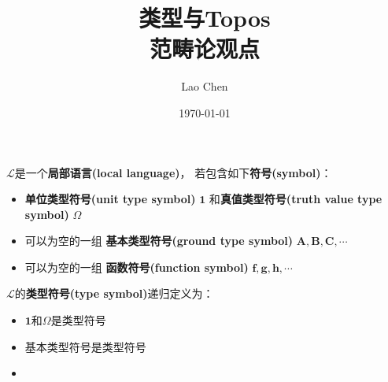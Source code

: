 \documentclass[10pt, openany]{book}
\begin{document}
\frontmatter
\title{\textbf{类型与Topos}\\ \large 范畴论观点}
\author{Lao Chen}
\date{\today}
\maketitle
\tableofcontents

\mainmatter

$\mathscr L$是一个\textbf{局部语言(local language)}，
若包含如下\textbf{符号(symbol)}：
\begin{itemize}
  \item 
  \textbf{单位类型符号(unit type symbol)} $\textbf{1}$
  和\textbf{真值类型符号(truth value type symbol)} $\Omega$
  \item 可以为空的一组
  \textbf{基本类型符号(ground type symbol)} $\textbf{A},\textbf{B},\textbf{C},\cdots$
  \item 可以为空的一组
  \textbf{函数符号(function symbol)} $\textbf{f},\textbf{g},\textbf{h},\cdots$
\end{itemize}

$\mathscr L$的\textbf{类型符号(type symbol)}递归定义为：
\begin{itemize}
  \item 
  $\textbf{1}$和$\Omega$是类型符号
  \item
  基本类型符号是类型符号
  \item

\end{itemize}
\end{document}
